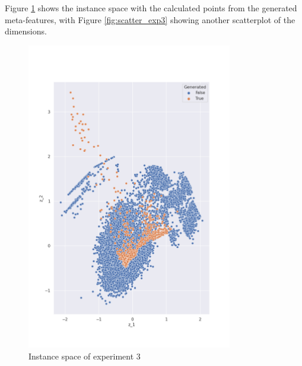 Figure \ref{fig:is_exp3} shows the instance space with the calculated points from the generated meta-features, with Figure \ref{fig:scatter_exp3} showing another scatterplot of the dimensions.

\begin{figure}[H]
    \centering
    \includegraphics[width=0.8\textwidth]{Cap5/all_coords3}
    \caption{Instance space of experiment 3}
    \label{fig:is_exp3}
\end{figure}

